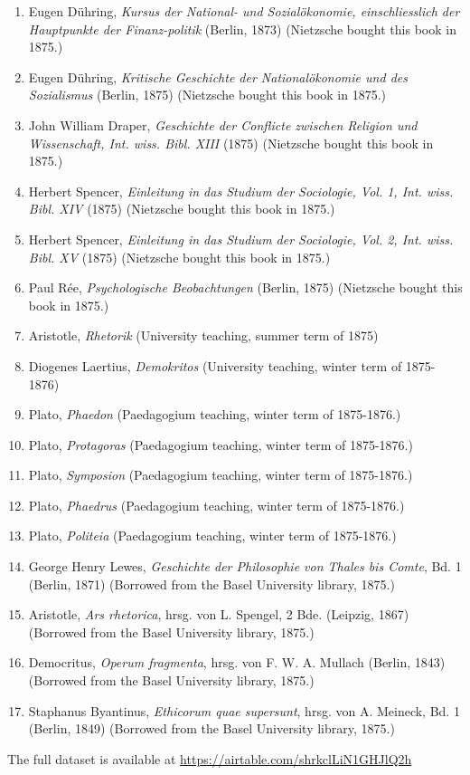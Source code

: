 \begin{enumerate}
    \item Eugen Dühring, \textit{Kursus der National- und Sozialökonomie, einschliesslich der Hauptpunkte der Finanz-politik} (Berlin, 1873) (Nietzsche bought this book in 1875.)
    \item Eugen Dühring, \textit{Kritische Geschichte der Nationalökonomie und des Sozialismus} (Berlin, 1875) (Nietzsche bought this book in 1875.)
    \item John William Draper, \textit{Geschichte der Conflicte zwischen Religion und Wissenschaft, Int. wiss. Bibl. XIII} (1875) (Nietzsche bought this book in 1875.)
    \item Herbert Spencer, \textit{Einleitung in das Studium der Sociologie, Vol. 1, Int. wiss. Bibl. XIV} (1875) (Nietzsche bought this book in 1875.)
    \item Herbert Spencer, \textit{Einleitung in das Studium der Sociologie, Vol. 2, Int. wiss. Bibl. XV} (1875) (Nietzsche bought this book in 1875.)
    \item Paul Rée, \textit{Psychologische Beobachtungen} (Berlin, 1875) (Nietzsche bought this book in 1875.)
    \item Aristotle, \textit{Rhetorik} (University teaching, summer term of 1875)
    \item Diogenes Laertius, \textit{Demokritos}	(University teaching, winter term of 1875-1876)
    \item Plato, \textit{Phaedon} (Paedagogium teaching, winter term of 1875-1876.)
    \item Plato, \textit{Protagoras} (Paedagogium teaching, winter term of 1875-1876.)
    \item Plato, \textit{Symposion} (Paedagogium teaching, winter term of 1875-1876.)
    \item Plato, \textit{Phaedrus} (Paedagogium teaching, winter term of 1875-1876.)
    \item Plato, \textit{Politeia} (Paedagogium teaching, winter term of 1875-1876.)
    \item George Henry Lewes, \textit{Geschichte der Philosophie von Thales bis Comte}, Bd. 1 (Berlin, 1871) (Borrowed from the Basel University library, 1875.)
    \item Aristotle, \textit{Ars rhetorica}, hrsg. von L. Spengel, 2 Bde. (Leipzig, 1867) (Borrowed from the Basel University library, 1875.)
    \item Democritus, \textit{Operum fragmenta}, hrsg. von F. W. A. Mullach (Berlin, 1843) (Borrowed from the Basel University library, 1875.)
    \item Staphanus Byantinus, \textit{Ethicorum quae supersunt}, hrsg. von A. Meineck, Bd. 1 (Berlin, 1849) (Borrowed from the Basel University library, 1875.)
\end{enumerate}

The full dataset is available at \href{https://airtable.com/shrkclLiN1GHJlQ2h}{https://airtable.com/shrkclLiN1GHJlQ2h}

